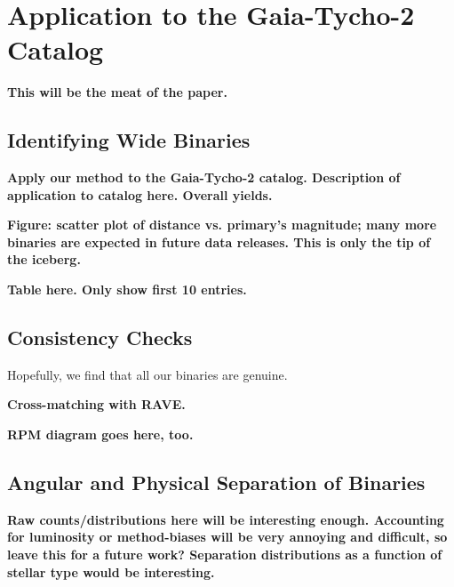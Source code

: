 \documentclass[usenatbib]{mnras}
\newcommand{\given}{\,|\,}
\begin{document}
\begin{comment}
\begin{figure}
\begin{center}
\texttt{[image: ../figures/tycho-2\_tmp.pdf]}
\caption{ The distribution of $P(vec{x}_i \given C_2, \vec{x}_j)$ and $P(\vec{x}_i \given C_1, \vec{x}_j)$ for the $\approx$8500 matches in the first 20\% of the Tycho-2 catalog. Lines indicating posterior probabilities of 50\% and 90\% are indicated by the red, dashed lines. The large number of samples between these two lines indicates that many matches are only marginally detected, and therefore sensitive to our model assumptions. }
\label{fig:tycho-2_tmp}
\end{center}
\end{figure}



\end{comment}



\section{Application to the Gaia-Tycho-2 Catalog}

{\bf This will be the meat of the paper.}

\subsection{Identifying Wide Binaries}
{\bf Apply our method to the Gaia-Tycho-2 catalog. Description of application to catalog here. Overall yields.}

{\bf Figure: scatter plot of distance vs. primary's magnitude; many more binaries are expected in future data releases. This is only the tip of the iceberg.}

{\bf Table here. Only show first 10 entries.}

\subsection{Consistency Checks}

Hopefully, we find that all our binaries are genuine. 

{\bf Cross-matching with RAVE.}

{\bf RPM diagram goes here, too.}


\subsection{Angular and Physical Separation of Binaries}
{\bf Raw counts/distributions here will be interesting enough. Accounting for luminosity or method-biases will be very annoying and difficult, so leave this for a future work? Separation distributions as a function of stellar type would be interesting.}
\end{document}
